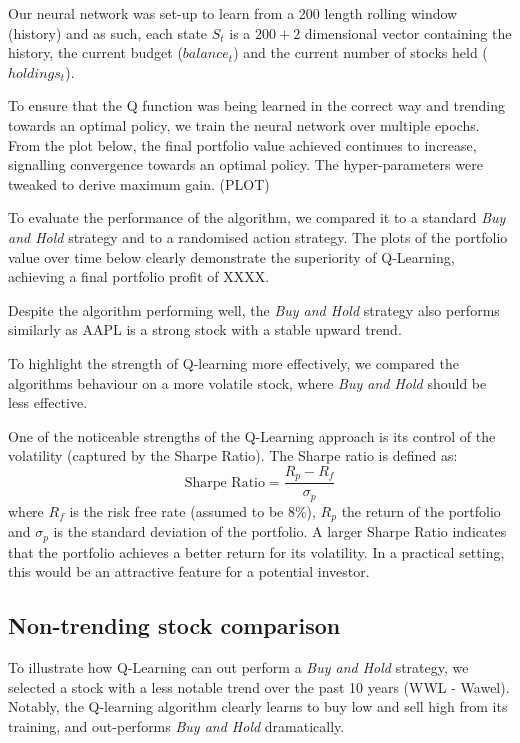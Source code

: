 \documentclass[12pt]{article}
\begin{document}
Our neural network was set-up to learn from a 200 length rolling window (history) and as such, each state $S_{t}$ is a $200+2$ dimensional vector containing the history, the current budget ($balance_{t}$) and the current number of stocks held ($holdings_{t}$).

To ensure that the Q function was being learned in the correct way and trending towards an optimal policy, we train the neural network over multiple epochs. From the plot below, the final portfolio value achieved continues to increase, signalling convergence towards an optimal policy. The hyper-parameters were tweaked to derive maximum gain. (PLOT)

To evaluate the performance of the algorithm, we compared it to a standard \textit{Buy and Hold} strategy and to a randomised action strategy. The plots of the portfolio value over time below clearly demonstrate the superiority of Q-Learning, achieving a final portfolio profit of XXXX.

Despite the algorithm performing well, the \textit{Buy and Hold} strategy also performs similarly as AAPL is a strong stock with a stable upward trend.



To highlight the strength of Q-learning more effectively, we compared the algorithms behaviour on a more volatile stock, where \textit{Buy and Hold} should be less effective.

One of the noticeable strengths of the Q-Learning approach is its control of the volatility (captured by the Sharpe Ratio). The Sharpe ratio is defined as:
$$
\text {Sharpe Ratio} = \frac { R _ { p } - R _ { f } } { \sigma _ { p } }
$$
where $R_{f}$ is the risk free rate (assumed to be 8\%), $R_{p}$ the return of the portfolio and $\sigma_{p}$ is the standard deviation of the portfolio. A larger Sharpe Ratio indicates that the portfolio achieves a better return for its volatility.
In a practical setting, this would be an attractive feature for a potential investor.

\subsection{Non-trending stock comparison}

To illustrate how Q-Learning can out perform a \textit{Buy and Hold} strategy, we selected a stock with a less notable trend over the past 10 years (WWL - Wawel). Notably, the Q-learning algorithm clearly learns to buy low and sell high from its training, and out-performs \textit{Buy and Hold} dramatically.
\end{document}

